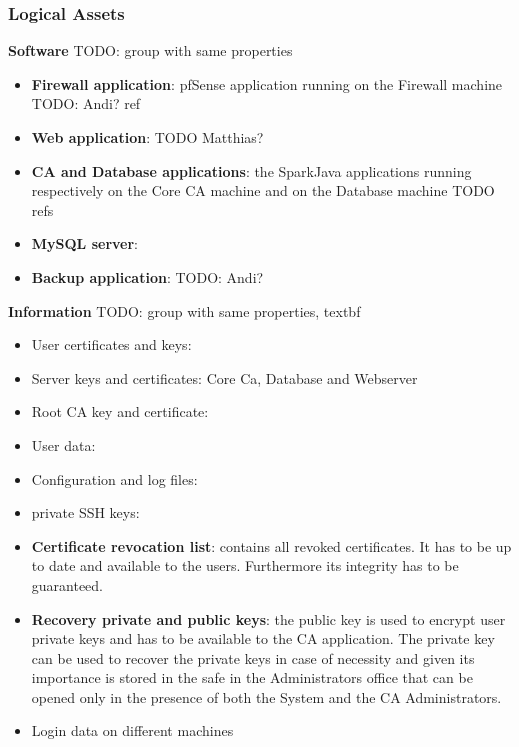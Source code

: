 \documentclass[english]{article}
\begin{document}

\subsubsection{\textbf{Logical Assets}}

\textbf{Software}
TODO: group with same properties
\begin{itemize}
\item \textbf{Firewall application}: pfSense application running on the Firewall machine TODO: Andi? ref
\item \textbf{Web application}: TODO Matthias?
\item \textbf{CA and Database applications}: the SparkJava applications running respectively on the Core CA machine and on the Database machine TODO refs
\item \textbf{MySQL server}:
\item \textbf{Backup application}: TODO: Andi?
\end{itemize}

\noindent\textbf{Information}
TODO: group with same properties, textbf
\begin{itemize}
\item User certificates and keys:
\item Server keys and certificates: Core Ca, Database and Webserver
\item Root CA key and certificate:
\item User data:
\item Configuration and log files:
\item private SSH keys:
\item \textbf{Certificate revocation list}: contains all revoked certificates. It has to be up to date and available to the users. Furthermore its integrity has to be guaranteed.
\item \textbf{Recovery private and public keys}: the public key is used to encrypt user private keys and has to be available to the CA application. The private key can be used to recover the private keys in case of necessity and given its importance is stored in the safe in the Administrators office that can be opened only in the presence of both the System and the CA Administrators.
\item Login data on different machines
\end{itemize}
\end{document}
